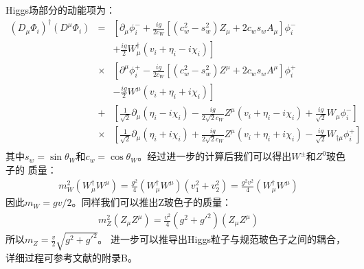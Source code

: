 Higgs场部分的动能项为：
\begin{eqnarray}
(D_{\mu}\Phi_i)^{\dagger}(D^{\mu}\Phi_i) &=& \left[\partial_{\mu}\phi^-_i + \frac{ig}{2c_W}
[(c^2_w-s^2_w)Z_{\mu} + 2c_w s_w A_{\mu}]\phi^-_i \right.
\nonumber \\
&& \left. + \frac{ig}{2}W^{\dagger}_{\mu}(v_i + \eta_i -i\chi_i)
\right]
\nonumber \\
&\times& \left[\partial^{\mu}\phi^+_i - \frac{ig}{2c_W}
[(c^2_w-s^2_w)Z^{\mu} + 2c_w s_w A^{\mu}]\phi^+_i \right.
\nonumber \\
&& \left. - \frac{ig}{2}W^{\mu}(v_i + \eta_i + i\chi_i)
\right]
\nonumber \\
&+& \left[\frac{1}{\sqrt 2}\partial_{\mu}(\eta_i - i\chi_i) - \frac{ig}{2\sqrt{2}c_W}Z^{\mu}
(v_i + \eta_i - i\chi_i) + \frac{ig}{\sqrt 2}W_{\mu}\phi^-_i \right]
\nonumber \\
&\times& \left[\frac{1}{\sqrt 2}\partial_{\mu}(\eta_i + i\chi_i) + \frac{ig}{2\sqrt{2}c_W}Z^{\mu}
(v_i + \eta_i + i\chi_i) - \frac{ig}{\sqrt 2}W_{\dagger\mu}\phi^+_i \right]
\nonumber \\
\end{eqnarray}
其中$s_w = \sin\theta_W$和$c_w = \cos\theta_W$。经过进一步的计算后我们可以得出$W^{\pm}$和$Z^0$玻色子的
质量：
\begin{eqnarray}
m^2_W(W^{\dagger}_{\mu} W^{\mu}) = \frac{g^2}{4}(W^{\dagger}_{\mu} W^{\mu})(v^2_1 + v^2_2) 
= \frac{g^2v^2}{4}(W^{\dagger}_{\mu} W^{\mu})
\end{eqnarray}
因此$m_W = gv/2$。同样我们可以推出Z玻色子的质量：
\begin{eqnarray}
m^2_Z (Z_{\mu}Z^{\mu}) = \frac{v^2}{4}(g^2+g'^2)(Z_{\mu}Z^{\mu})
\end{eqnarray}
所以$m_Z = \frac{v}{2}\sqrt{g^2+g'^2}$。
进一步可以推导出Higgs粒子与规范玻色子之间的耦合，详细过程可参考文献\cite{Osland:2hdm}的附录B。

